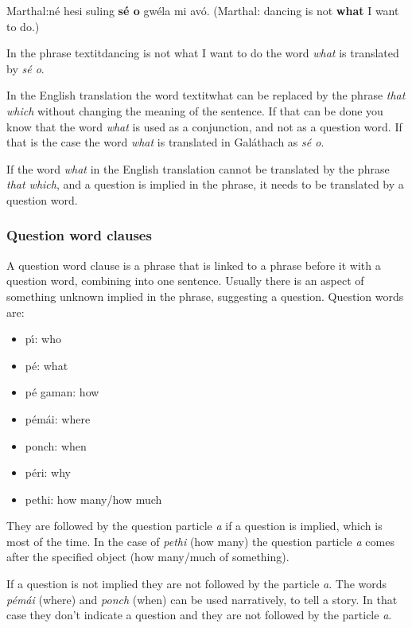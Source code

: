 Marthal:n\'{e} hesi suling \textbf{s\'{e} o} gw\'{e}la mi av\'{o}.
(Marthal: dancing is not \textbf{what} I want to do.)

In the phrase textit{dancing is not what I want to do} the word \textit{what} is translated by \textit{s\'{e} o}.

In the English translation the word textit{what} can be replaced by the phrase \textit{that which} without changing the meaning of the sentence. If that can be done you know that the word \textit{what} is used as a conjunction, and not as a question word. If that is the case the word \textit{what} is translated in Gal\'{a}thach as \textit{s\'{e} o}.

If the word \textit{what} in the English translation cannot be translated by the phrase \textit{that which}, and a question is implied in the phrase, it needs to be translated by a question word.

\subsubsection{Question word clauses}

A question word clause is a phrase that is linked to a phrase before it with a question word, combining into one sentence. Usually there is an aspect of something unknown implied in the phrase, suggesting a question. Question words are:

\begin{itemize}
  \item p\'{\i}: who
  \item p\'{e}: what
  \item p\'{e} gaman: how
  \item p\'{e}m\'{a}i: where
  \item ponch: when
  \item p\'{e}ri: why
  \item pethi: how many/how much
\end{itemize}

They are followed by the question particle \textit{a} if a question is implied, which is most of the time. In the case of \textit{pethi} (how many) the question particle \textit{a} comes after the specified object (how many/much of something).

If a question is not implied they are not followed by the particle \textit{a}. The words \textit{p\'{e}m\'{a}i} (where) and \textit{ponch} (when) can be used narratively, to tell a story. In that case they don't indicate a question and they are not followed by the particle \textit{a}.

